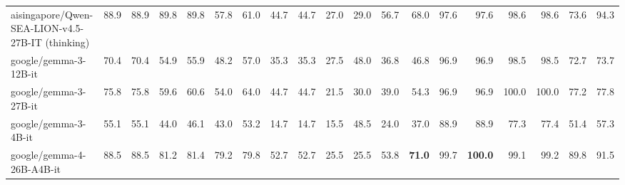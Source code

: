 \documentclass{article}
\begin{document}
\begin{table}[htbp]
\begin{threeparttable}
\begin{adjustbox}{max width=\textwidth}
\begin{tabular}{lrrrrrrrrrrrrrrrrrr}
aisingapore/Qwen-SEA-LION-v4.5-27B-IT (thinking) & \cellcolor[HTML]{9DCAE1}88.9 & \cellcolor[HTML]{9DCAE1}88.9 & \cellcolor[HTML]{9DCBE1}89.8 & \cellcolor[HTML]{9ECBE1}89.8 & \cellcolor[HTML]{E5F1F7}57.8 & \cellcolor[HTML]{E4F1F7}61.0 & \cellcolor[HTML]{BFDDEB}44.7 & \cellcolor[HTML]{C0DDEB}44.7 & \cellcolor[HTML]{F6FAFC}27.0 & \cellcolor[HTML]{FAD9CB}29.0 & \cellcolor[HTML]{A2CDE2}56.7 & \cellcolor[HTML]{A1CDE2}68.0 & \cellcolor[HTML]{98C8DF}97.6 & \cellcolor[HTML]{98C8DF}97.6 & \cellcolor[HTML]{95C6DE}98.6 & \cellcolor[HTML]{95C6DE}98.6 & \cellcolor[HTML]{C8E2EE}73.6 & \cellcolor[HTML]{97C7DF}94.3 \\
google/gemma-3-12B-it & \cellcolor[HTML]{FCFDFE}70.4 & \cellcolor[HTML]{FCFDFE}70.4 & \cellcolor[HTML]{F7FBFC}54.9 & \cellcolor[HTML]{F7FBFC}55.9 & \cellcolor[HTML]{FEF7F4}48.2 & \cellcolor[HTML]{F5F9FC}57.0 & \cellcolor[HTML]{E9F3F8}35.3 & \cellcolor[HTML]{EBF4F8}35.3 & \cellcolor[HTML]{F4F9FB}27.5 & \cellcolor[HTML]{B2D6E7}48.0 & \cellcolor[HTML]{FDF6F2}36.8 & \cellcolor[HTML]{FDF2ED}46.8 & \cellcolor[HTML]{99C9E0}96.9 & \cellcolor[HTML]{99C9E0}96.9 & \cellcolor[HTML]{95C6DE}98.5 & \cellcolor[HTML]{95C6DE}98.5 & \cellcolor[HTML]{CBE3EF}72.7 & \cellcolor[HTML]{CAE2EF}73.7 \\
google/gemma-3-27B-it & \cellcolor[HTML]{E0EEF5}75.8 & \cellcolor[HTML]{E0EEF5}75.8 & \cellcolor[HTML]{EBF4F9}59.6 & \cellcolor[HTML]{EBF4F9}60.6 & \cellcolor[HTML]{F2F8FB}54.0 & \cellcolor[HTML]{D8EAF3}64.0 & \cellcolor[HTML]{BFDDEB}44.7 & \cellcolor[HTML]{C0DDEB}44.7 & \cellcolor[HTML]{FDF0EB}21.5 & \cellcolor[HTML]{FBDFD2}30.0 & \cellcolor[HTML]{FEFEFE}39.0 & \cellcolor[HTML]{E7F2F7}54.3 & \cellcolor[HTML]{99C9E0}96.9 & \cellcolor[HTML]{99C9E0}96.9 & \cellcolor[HTML]{92C5DE}100.0 & \cellcolor[HTML]{92C5DE}100.0 & \cellcolor[HTML]{BFDDEB}77.2 & \cellcolor[HTML]{C0DDEC}77.8 \\
google/gemma-3-4B-it & \cellcolor[HTML]{F7C0A8}55.1 & \cellcolor[HTML]{F7C0A7}55.1 & \cellcolor[HTML]{FCEEE7}44.0 & \cellcolor[HTML]{FDEFE9}46.1 & \cellcolor[HTML]{FCE7DE}43.0 & \cellcolor[HTML]{FEF9F7}53.2 & \cellcolor[HTML]{F7C3AB}14.7 & \cellcolor[HTML]{F7C0A8}14.7 & \cellcolor[HTML]{FADACB}15.5 & \cellcolor[HTML]{AED4E6}48.5 & \cellcolor[HTML]{F7BEA5}24.0 & \cellcolor[HTML]{F8C9B4}37.0 & \cellcolor[HTML]{ADD3E6}88.9 & \cellcolor[HTML]{AED4E6}88.9 & \cellcolor[HTML]{C3DFED}77.3 & \cellcolor[HTML]{C3DFED}77.4 & \cellcolor[HTML]{FEFEFD}51.4 & \cellcolor[HTML]{F2F8FB}57.3 \\
google/gemma-4-26B-A4B-it & \cellcolor[HTML]{9FCBE1}88.5 & \cellcolor[HTML]{9FCBE1}88.5 & \cellcolor[HTML]{B3D6E8}81.2 & \cellcolor[HTML]{B4D7E8}81.4 & \cellcolor[HTML]{95C6DF}79.2 & \cellcolor[HTML]{96C7DF}79.8 & \cellcolor[HTML]{9BC9E0}52.7 & \cellcolor[HTML]{9BC9E0}52.7 & \cellcolor[HTML]{FDFEFE}25.5 & \cellcolor[HTML]{F8C7B1}25.5 & \cellcolor[HTML]{B1D5E7}53.8 & \cellcolor[HTML]{92C5DE}\textbf{71.0} & \cellcolor[HTML]{92C5DE}99.7 & \cellcolor[HTML]{92C5DE}\textbf{100.0} & \cellcolor[HTML]{93C6DE}99.1 & \cellcolor[HTML]{93C5DE}99.2 & \cellcolor[HTML]{A0CCE2}89.8 & \cellcolor[HTML]{9ECBE1}91.5 \\

\end{tabular}
\end{adjustbox}
\end{threeparttable}
\end{table}
\end{document}
